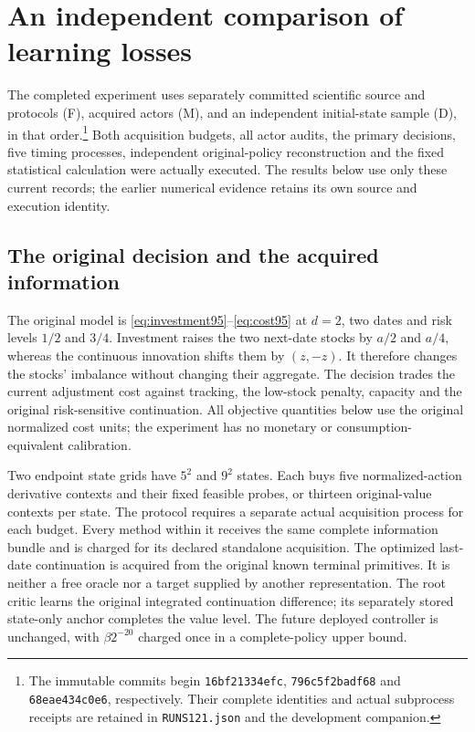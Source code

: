 \section{An independent comparison of learning losses}
\label{sec:numerical121}

The completed experiment uses separately committed scientific source and
protocols (F), acquired actors (M), and an independent initial-state sample
(D), in that order.\footnote{The immutable commits begin
\texttt{16bf21334efc}, \texttt{796c5f2badf68} and
\texttt{68eae434c0e6}, respectively. Their complete identities and actual
subprocess receipts are retained in \texttt{RUNS121.json} and the development
companion.} Both acquisition budgets, all actor audits, the primary decisions,
five timing processes, independent original-policy reconstruction and the
fixed statistical calculation were actually executed. The results below use
only these current records; the earlier numerical evidence retains its own
source and execution identity.

\subsection{The original decision and the acquired information}
\label{subsec:design121}

The original model is \eqref{eq:investment95}--\eqref{eq:cost95} at $d=2$,
two dates and risk levels $1/2$ and $3/4$. Investment raises the two next-date
stocks by $a/2$ and $a/4$, whereas the continuous innovation shifts them by
$(z,-z)$. It therefore changes the stocks' imbalance without changing their
aggregate. The decision trades the current adjustment cost against tracking,
the low-stock penalty, capacity and the original risk-sensitive continuation.
All objective quantities below use the original normalized cost units; the
experiment has no monetary or consumption-equivalent calibration.

Two endpoint state grids have
$5^2$ and $9^2$ states. Each buys five normalized-action derivative contexts
and their fixed feasible probes, or thirteen original-value contexts per
state. The protocol requires a separate actual acquisition process for each
budget. Every method
within it receives the same complete information bundle and is charged for
its declared standalone acquisition. The optimized last-date continuation is
acquired from the original known terminal primitives. It is neither a free
oracle nor a target supplied by another representation. The root critic learns
the original integrated continuation difference; its separately stored
state-only anchor completes the value level. The future deployed controller
is unchanged, with $\beta 2^{-20}$ charged once in a complete-policy upper
bound.

